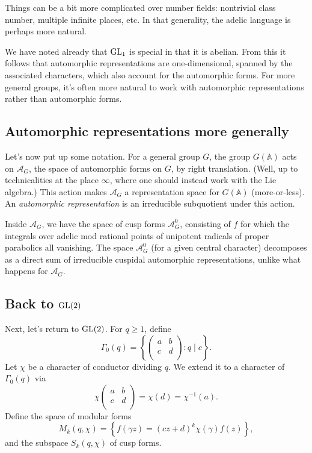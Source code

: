 \documentclass[reqno]{amsart} 
\begin{document}
Things can be a bit more complicated over number fields: nontrivial class number, multiple infinite places, etc.  In that generality, the adelic language is perhaps more natural.

We have noted already that $\operatorname{GL}_1$ is special in that it is abelian.  From this it follows that automorphic representations are one-dimensional, spanned by the associated characters, which also account for the automorphic forms.  For more general groups, it's often more natural to work with automorphic representations rather than automorphic forms.

\subsection{Automorphic representations more generally}

Let's now put up some notation.  For a general group $G$, the group $G(\mathbb{A})$ acts on $\mathcal{A}_G$, the space of automorphic forms on $G$, by right translation.  (Well, up to technicalities at the place $\infty$, where one should instead work with the Lie algebra.)  This action makes $\mathcal{A}_G$ a representation space for $G(\mathbb{A})$ (more-or-less).  An \emph{automorphic representation} is an irreducible subquotient under this action.

Inside $\mathcal{A}_G$, we have the space of cusp forms $\mathcal{A}_G^0$, consisting of $f$ for which the integrals over adelic mod rational points of unipotent radicals of proper parabolics all vanishing.  The space $\mathcal{A}_G^0$ (for a given central character) decomposes as a direct sum of irreducible cuspidal automorphic representations, unlike what happens for $\mathcal{A}_G$.

\subsection{Back to $\operatorname{GL}(2)$}

Next, let's return to $\operatorname{GL}(2)$.  For $q \geq 1$, define
\begin{equation*}
  \Gamma_0(q) = \left\{
    \begin{pmatrix}
      a & b \\
      c & d \\
    \end{pmatrix} : q \mid c \right\}.
\end{equation*}
Let $\chi$ be a character of conductor dividing $q$.  We extend it to a character of $\Gamma_0(q)$ via
\begin{equation*}
  \chi
  \begin{pmatrix}
    a    & b \\
    c & d \\
  \end{pmatrix}
  = \chi(d) = \chi^{-1}(a).
\end{equation*}
Define the space of modular forms
\begin{equation*}
  M_k(q, \chi) =
  \left\{ f(\gamma z) =(c z + d)^k \chi(\gamma) f(z) \right\},
\end{equation*}
and the subspace $S_k(q, \chi)$ of cusp forms.
\end{document}
